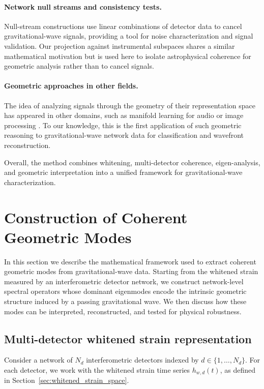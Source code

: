 \documentclass[11pt,a4paper]{article}
\begin{document}
\paragraph{Network null streams and consistency tests.}
Null-stream constructions \cite{Wen2008, Chatziioannou2019} use linear combinations of detector data to cancel gravitational-wave signals, providing a tool for noise characterization and signal validation. Our projection against instrumental subspaces shares a similar mathematical motivation but is used here to isolate astrophysical coherence for geometric analysis rather than to cancel signals.

\paragraph{Geometric approaches in other fields.}
The idea of analyzing signals through the geometry of their representation space has appeared in other domains, such as manifold learning for audio or image processing \cite{Roweis2000}. To our knowledge, this is the first application of such geometric reasoning to gravitational-wave network data for classification and wavefront reconstruction.

Overall, the method combines whitening, multi-detector coherence, eigen-analysis, and geometric interpretation into a unified framework for gravitational-wave characterization.

\section{Construction of Coherent Geometric Modes}
\label{sec:construction}

In this section we describe the mathematical framework used to extract coherent geometric modes from gravitational-wave data. Starting from the whitened strain measured by an interferometric detector network, we construct network-level spectral operators whose dominant eigenmodes encode the intrinsic geometric structure induced by a passing gravitational wave. We then discuss how these modes can be interpreted, reconstructed, and tested for physical robustness.

\subsection{Multi-detector whitened strain representation}

Consider a network of $N_d$ interferometric detectors indexed by $d \in \{1,\dots,N_d\}$.
For each detector, we work with the whitened strain time series $h_{w,d}(t)$, as defined in Section~\ref{sec:whitened_strain_space}.
\end{document}
